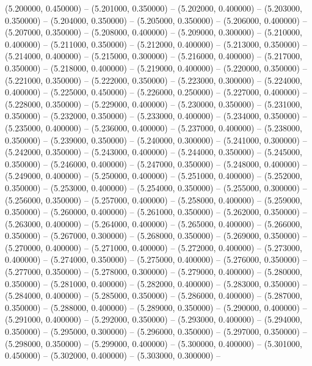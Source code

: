 (5.200000, 0.450000) -- 
(5.201000, 0.350000) -- 
(5.202000, 0.400000) -- 
(5.203000, 0.350000) -- 
(5.204000, 0.350000) -- 
(5.205000, 0.350000) -- 
(5.206000, 0.400000) -- 
(5.207000, 0.350000) -- 
(5.208000, 0.400000) -- 
(5.209000, 0.300000) -- 
(5.210000, 0.400000) -- 
(5.211000, 0.350000) -- 
(5.212000, 0.400000) -- 
(5.213000, 0.350000) -- 
(5.214000, 0.400000) -- 
(5.215000, 0.300000) -- 
(5.216000, 0.400000) -- 
(5.217000, 0.350000) -- 
(5.218000, 0.400000) -- 
(5.219000, 0.400000) -- 
(5.220000, 0.350000) -- 
(5.221000, 0.350000) -- 
(5.222000, 0.350000) -- 
(5.223000, 0.300000) -- 
(5.224000, 0.400000) -- 
(5.225000, 0.450000) -- 
(5.226000, 0.250000) -- 
(5.227000, 0.400000) -- 
(5.228000, 0.350000) -- 
(5.229000, 0.400000) -- 
(5.230000, 0.350000) -- 
(5.231000, 0.350000) -- 
(5.232000, 0.350000) -- 
(5.233000, 0.400000) -- 
(5.234000, 0.350000) -- 
(5.235000, 0.400000) -- 
(5.236000, 0.400000) -- 
(5.237000, 0.400000) -- 
(5.238000, 0.350000) -- 
(5.239000, 0.350000) -- 
(5.240000, 0.300000) -- 
(5.241000, 0.300000) -- 
(5.242000, 0.350000) -- 
(5.243000, 0.400000) -- 
(5.244000, 0.350000) -- 
(5.245000, 0.350000) -- 
(5.246000, 0.400000) -- 
(5.247000, 0.350000) -- 
(5.248000, 0.400000) -- 
(5.249000, 0.400000) -- 
(5.250000, 0.400000) -- 
(5.251000, 0.400000) -- 
(5.252000, 0.350000) -- 
(5.253000, 0.400000) -- 
(5.254000, 0.350000) -- 
(5.255000, 0.300000) -- 
(5.256000, 0.350000) -- 
(5.257000, 0.400000) -- 
(5.258000, 0.400000) -- 
(5.259000, 0.350000) -- 
(5.260000, 0.400000) -- 
(5.261000, 0.350000) -- 
(5.262000, 0.350000) -- 
(5.263000, 0.400000) -- 
(5.264000, 0.400000) -- 
(5.265000, 0.400000) -- 
(5.266000, 0.350000) -- 
(5.267000, 0.300000) -- 
(5.268000, 0.350000) -- 
(5.269000, 0.350000) -- 
(5.270000, 0.400000) -- 
(5.271000, 0.400000) -- 
(5.272000, 0.400000) -- 
(5.273000, 0.400000) -- 
(5.274000, 0.350000) -- 
(5.275000, 0.400000) -- 
(5.276000, 0.350000) -- 
(5.277000, 0.350000) -- 
(5.278000, 0.300000) -- 
(5.279000, 0.400000) -- 
(5.280000, 0.350000) -- 
(5.281000, 0.400000) -- 
(5.282000, 0.400000) -- 
(5.283000, 0.350000) -- 
(5.284000, 0.400000) -- 
(5.285000, 0.350000) -- 
(5.286000, 0.400000) -- 
(5.287000, 0.350000) -- 
(5.288000, 0.400000) -- 
(5.289000, 0.350000) -- 
(5.290000, 0.400000) -- 
(5.291000, 0.400000) -- 
(5.292000, 0.350000) -- 
(5.293000, 0.400000) -- 
(5.294000, 0.350000) -- 
(5.295000, 0.300000) -- 
(5.296000, 0.350000) -- 
(5.297000, 0.350000) -- 
(5.298000, 0.350000) -- 
(5.299000, 0.400000) -- 
(5.300000, 0.400000) -- 
(5.301000, 0.450000) -- 
(5.302000, 0.400000) -- 
(5.303000, 0.300000) -- 
